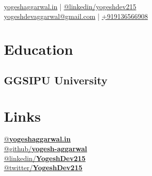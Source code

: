 \documentclass[]{deedy-resume-openfont}
\begin{document}
\lastupdated

{
    \href{https://yogeshaggarwal.in}{yogeshaggarwal.in} | \href{https://www.linkedin.com/in/yogeshdev215/}{@linkedin/yogeshdev215}
    \\[1.5pt]
    \href{mailto:yogeshdevaggarwal@gmail.com}{yogeshdevaggarwal@gmail.com} | \href{tel:+919136566908}{+919136566908}
}


\begin{minipage}[t]{0.31\textwidth} 


\section{Education}

\subsection{GGSIPU University}
\sectionsep


\section{Links} 
\href{https://yogeshaggarwal.in}{@\bf{yogeshaggarwal.in}} \\[2pt]
\href{https://github.com/yogesh-aggarwal}{@github/\bf{yogesh-aggarwal}} \\[2pt]
\href{https://linkedin.com/in/yogeshdev215}{@linkedin/\bf{YogeshDev215}} \\[2pt]
\href{https://twitter.com/YogeshDev215}{@twitter/\bf{YogeshDev215}} \\[2pt]

\hspace{1pt}


\end{minipage}
\end{document}
